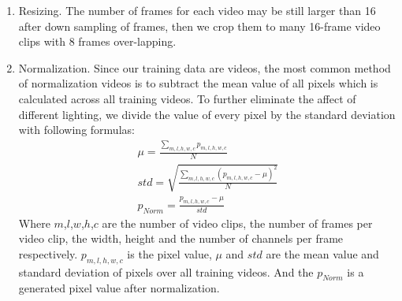 \begin{enumerate}
	\item Resizing. The number of frames for each video may be still larger than 16 after down sampling of frames, then we crop them to many 16-frame video clips with 8 frames over-lapping.
	\label{normalization}
	\item Normalization. Since our training data are videos, the most common method of normalization videos is to subtract the mean value of all pixels which is calculated across all training videos. To further eliminate the affect of different lighting, we divide the value of every pixel by the standard deviation with following formulas: 
	\begin{eqnarray}
		\mu = \frac{\sum_{m,l,h,w,c}p_{m,l,h,w,c}}{N} \\
		std = \sqrt{\frac{\sum_{m,l,h,w,c}(p_{m,l,h,w,c}-\mu)^2}{N}} \\
		p_{Norm} = \frac{p_{m,l,h,w,c} - \mu}{std}
	\end{eqnarray} 
	Where \(m\),\(l\),\(w\),\(h\),\(c\) are the number of video clips, the number of frames per video clip, the width, height and the number of channels per frame respectively.  \(p_{m,l,h,w,c}\) is the pixel value, \(\mu\) and \(std\) are the mean value and standard deviation of pixels over all training videos. And the \(p_{Norm}\) is a generated pixel value after normalization. 
\end{enumerate} 

